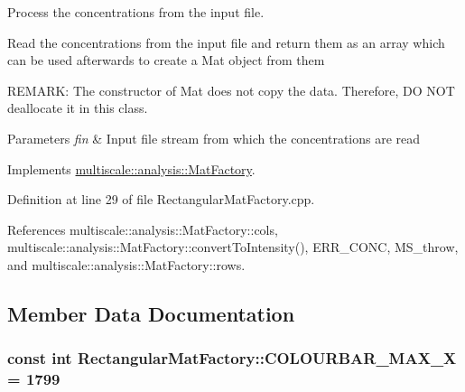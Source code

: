 \-Process the concentrations from the input file. 

\-Read the concentrations from the input file and return them as an array which can be used afterwards to create a \-Mat object from them

\-R\-E\-M\-A\-R\-K\-: \-The constructor of \-Mat does not copy the data. \-Therefore, \-D\-O \-N\-O\-T deallocate it in this class.


\begin{DoxyParams}{\-Parameters}
{\em fin} & \-Input file stream from which the concentrations are read \\
\hline
\end{DoxyParams}


\-Implements \hyperlink{classmultiscale_1_1analysis_1_1MatFactory_a0493c87d7b74619a95f14c0e31a3e178}{multiscale\-::analysis\-::\-Mat\-Factory}.



\-Definition at line 29 of file \-Rectangular\-Mat\-Factory.\-cpp.



\-References multiscale\-::analysis\-::\-Mat\-Factory\-::cols, multiscale\-::analysis\-::\-Mat\-Factory\-::convert\-To\-Intensity(), \-E\-R\-R\-\_\-\-C\-O\-N\-C, \-M\-S\-\_\-throw, and multiscale\-::analysis\-::\-Mat\-Factory\-::rows.



\subsection{\-Member \-Data \-Documentation}
\hypertarget{classmultiscale_1_1analysis_1_1RectangularMatFactory_a9a91307705bb2d4cc8e837718ce330a8}{
\subsubsection[{\-C\-O\-L\-O\-U\-R\-B\-A\-R\-\_\-\-M\-A\-X\-\_\-\-X}]{\setlength{\rightskip}{0pt plus 5cm}const int {\bf \-Rectangular\-Mat\-Factory\-::\-C\-O\-L\-O\-U\-R\-B\-A\-R\-\_\-\-M\-A\-X\-\_\-\-X} = 1799}}\label{classmultiscale_1_1analysis_1_1RectangularMatFactory_a9a91307705bb2d4cc8e837718ce330a8}


